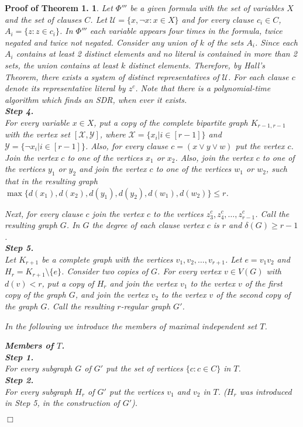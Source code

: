 \documentclass[
final
]{dmtcs-episciences}
\newtheorem{preali}{{\bf Proof of Theorem 1.}}
\newenvironment{ali}[1]{\begin{preali}{\rm
			#1}\hfill{$\Box$}}{\end{preali}}
\begin{document}
\begin{ali}
{		Let $\Phi'''$ be a given formula with the set of variables $X$ and the set of clauses $C$.
		Let $\mathcal{U}=\{x,\neg x : x\in X\}$ and for every clause $c_i\in C$, $A_i=\{z: z\in c_i\}$.
		In $\Phi '''$ each variable appears four
		times in the formula, twice negated and twice not negated.
		Consider any union of $k$ of the sets $A_i$. Since each $A_i$ contains at least 2 distinct elements and no literal is contained in more than 2 sets, the union contains at least $k$ distinct
		elements. Therefore, by   Hall's Theorem, there exists a system of distinct representatives
		of $\mathcal{U}$. For each clause $c$ denote its representative literal by $z^{c}$. Note that there is a polynomial-time algorithm which finds an SDR, when ever it exists.\\
		{{\bf Step 4.}}\\
		For every variable $x\in X$, put a copy of the complete bipartite graph $K_{r-1,r-1}$ with the vertex set $[\mathcal{X}, \mathcal{Y}]$, where $\mathcal{X}=\{x_i | i\in [r-1]\}$ and $\mathcal{Y}=\{\neg x_i | i\in [r-1]\}$.
		Also, for every clause $c=(x \vee y \vee w)$ put the vertex $c$.
		Join the vertex $c$ to one of the vertices $x_1$ or $x_2$. Also, join the vertex $c$ to one of the vertices $ y_1$ or $y_2$ and join the vertex $c$ to one of the vertices $w_1$ or $w_2$, such that in the resulting graph $\max\{d(x_1),d(x_2),d(y_1),d(y_2),d(w_1),d(w_2)\} \leq r$.
		
		Next, for every clause $c$ join the vertex $c$ to the vertices $z^{c}_3, z^{c}_4, \ldots, z^{c}_{r-1}$.
		Call the resulting graph $G$. In $G$ the degree of each clause vertex $c$ is $r$ and $\delta(G)\geq r-1$.\\
		{{\bf Step 5.}}\\
		Let $K_{r+1}$ be a complete graph with the vertices $v_1,v_2,\ldots,v_{r+1}$. Let $e=v_1v_2$ and $H_r=K_{r+1}\setminus \{e\}$. Consider two copies of $G$. For every vertex $v\in V(G)$ with $d(v)<r$, put a copy of $H_r$ and join the vertex $v_1$ to the vertex $v$ of the first copy of the graph $G$, and join the vertex $v_2$  to the vertex $v$ of the second copy of the graph $G$.
		Call the resulting $r$-regular graph $G'$.
		
		In the following we introduce the members of maximal independent set $T$.
		
		{{\bf  Members of $T$.}}\\
		{{\bf Step 1.}}\\
		For every subgraph   $G$ of $G'$ put the set of vertices $\{c: c\in C\}$ in $T$.\\
		{{\bf Step 2.}}\\
		For every subgraph  $H_r$ of $G'$ put the vertices $v_1$ and $v_2$ in $T$. ($H_r$ was introduced in Step 5, in the construction of $G'$).
		
}
\end{ali}
\end{document}
